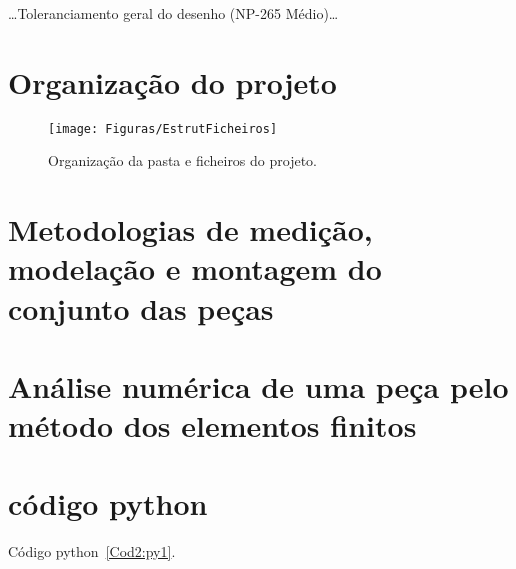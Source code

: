 \ldots Toleranciamento geral do desenho (\eg NP-265 Médio)\ldots

\section{Organização do projeto}

\begin{figure}[t]\label{F:EstFich}
\centering
\texttt{[image: Figuras/EstrutFicheiros]}
\caption{Organização da pasta e ficheiros do projeto.}
\end{figure}

\section{Metodologias de medição, modelação e montagem do conjunto das peças}

\section{Análise numérica de uma peça pelo método dos elementos
finitos}


\section{código python}

Código python~\ref{Cod2:py1}.

\begin{minipage}[t]{1.\textwidth}
\begin{spacing}{1.0}

\end{spacing}
\end{minipage}